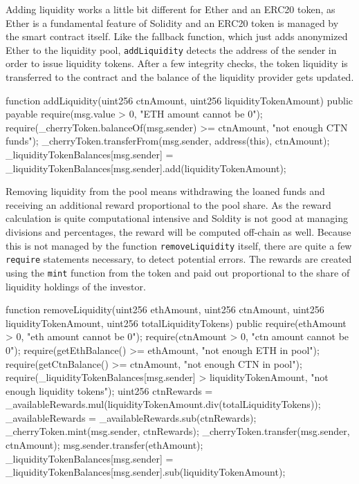 Adding liquidity works a little bit different for Ether and an ERC20 token, as Ether is a fundamental feature of Solidity and an ERC20 token is managed by
the smart contract itself. Like the fallback function, which just adds anonymized Ether to the liquidity pool, \texttt{addLiquidity} detects the address
of the sender in order to issue liquidity tokens. After a few integrity checks, the token liquidity is transferred to the contract and the balance of the liquidity
provider gets updated.
\begin{GenericCode}
function addLiquidity(uint256 ctnAmount, uint256 liquidityTokenAmount) public payable {
  require(msg.value > 0, "ETH amount cannot be 0");
  require(_cherryToken.balanceOf(msg.sender) >= ctnAmount, "not enough CTN funds");
  _cherryToken.transferFrom(msg.sender, address(this), ctnAmount);
  _liquidityTokenBalances[msg.sender] = _liquidityTokenBalances[msg.sender].add(liquidityTokenAmount);
}
\end{GenericCode}

Removing liquidity from the pool means withdrawing the loaned funds and receiving an additional reward proportional to the pool share.
As the reward calculation is quite computational intensive and Soldity is not good at managing divisions and percentages, the reward will be computed
off-chain as well. Because this is not managed by the function \texttt{removeLiquidity} itself, there are quite a few \texttt{require} statements necessary,
to detect potential errors. The rewards are created using the \texttt{mint} function from the token and paid out proportional to the share of liquidity holdings
of the investor.
\begin{GenericCode}
function removeLiquidity(uint256 ethAmount, uint256 ctnAmount, uint256 liquidityTokenAmount, uint256 totalLiquidityTokens) public {
  require(ethAmount > 0, "eth amount cannot be 0");
  require(ctnAmount > 0, "ctn amount cannot be 0");
  require(getEthBalance() >= ethAmount, "not enough ETH in pool");
  require(getCtnBalance() >= ctnAmount, "not enough CTN in pool");
  require(_liquidityTokenBalances[msg.sender] > liquidityTokenAmount, "not enough liquidity tokens");
  uint256 ctnRewards = _availableRewards.mul(liquidityTokenAmount.div(totalLiquidityTokens));
  _availableRewards = _availableRewards.sub(ctnRewards);
  _cherryToken.mint(msg.sender, ctnRewards);
  _cherryToken.transfer(msg.sender, ctnAmount);
  msg.sender.transfer(ethAmount);
  _liquidityTokenBalances[msg.sender] = _liquidityTokenBalances[msg.sender].sub(liquidityTokenAmount);
}
\end{GenericCode}

